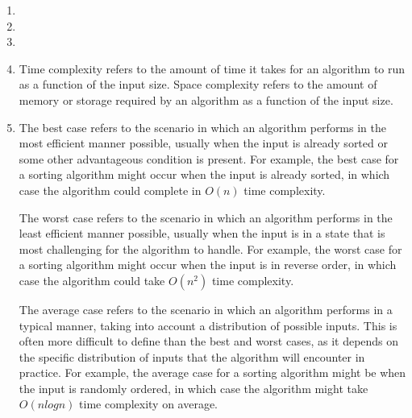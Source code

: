 \documentclass{article}
\begin{document}
\begin{enumerate}
\begin{enumerate}
    \end{enumerate}
    
    \item 

    \item 

    \item 
    
    \item  Time complexity refers to the amount of time it takes for an algorithm to run as a function of the input size.
    Space complexity refers to the amount of memory or storage required by an algorithm as a function of the input size. 
    
    \item  The best case refers to the scenario in which an algorithm performs in the most efficient manner possible, usually when the input is already sorted or some other advantageous condition is present. For example, the best case for a sorting algorithm might occur when the input is already sorted, in which case the algorithm could complete in $O(n)$ time complexity.
    
    The worst case refers to the scenario in which an algorithm performs in the least efficient manner possible, usually when the input is in a state that is most challenging for the algorithm to handle. For example, the worst case for a sorting algorithm might occur when the input is in reverse order, in which case the algorithm could take $O(n^2)$ time complexity.
    
    The average case refers to the scenario in which an algorithm performs in a typical manner, taking into account a distribution of possible inputs. This is often more difficult to define than the best and worst cases, as it depends on the specific distribution of inputs that the algorithm will encounter in practice. For example, the average case for a sorting algorithm might be when the input is randomly ordered, in which case the algorithm might take $O(n log n)$ time complexity on average.

    


\end{enumerate}
\end{document}
